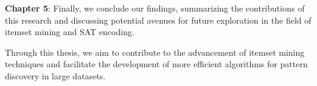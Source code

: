 \textbf{Chapter 5}: Finally, we conclude our findings, summarizing the contributions of this research and discussing potential avenues for future exploration in the field of itemset mining and SAT encoding.

Through this thesis, we aim to contribute to the advancement of itemset mining techniques and facilitate the development of more efficient algorithms for pattern discovery in large datasets.